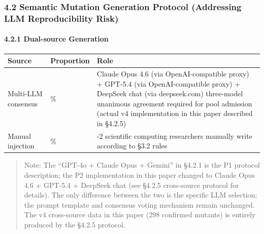 \documentclass[review,12pt,authoryear]{elsarticle}
\begin{document}
\subsubsection{4.2 Semantic Mutation Generation Protocol (Addressing LLM
Reproducibility
Risk)}\label{semantic-mutation-generation-protocol-addressing-llm-reproducibility-risk}

\paragraph{4.2.1 Dual-source Generation}\label{dual-source-generation}

{\def\LTcaptype{none} %
\begin{longtable}[]{@{}
  >{\raggedright\arraybackslash}p{}
  >{\raggedright\arraybackslash}p{}
  >{\raggedright\arraybackslash}p{}@{}}
\toprule\noalign{}
\begin{minipage}[b]{\linewidth}\raggedright
Source
\end{minipage} & \begin{minipage}[b]{\linewidth}\raggedright
Proportion
\end{minipage} & \begin{minipage}[b]{\linewidth}\raggedright
Role
\end{minipage} \\
\midrule\noalign{}
\endhead
\bottomrule\noalign{}
\endlastfoot
Multi-LLM consensus & 60\% & Claude Opus 4.6 (via OpenAI-compatible proxy) + GPT-5.4
(via OpenAI-compatible proxy) + DeepSeek chat (via deepseek.com) three-model unanimous
agreement required for pool admission (actual v4 implementation in this
paper described in §4.2.5) \\
Manual injection & 40\% & 1-2 scientific computing researchers manually
write according to §3.2 rules \\
\end{longtable}
}

\begin{quote}
Note: The ``GPT-4o + Claude Opus + Gemini'' in §4.2.1 is the P1 protocol
description; the P2 implementation in this paper changed to Claude Opus
4.6 + GPT-5.4 + DeepSeek chat (see §4.2.5 cross-source protocol for
details). The only difference between the two is the specific LLM
selection; the prompt template and consensus voting mechanism remain
unchanged. The v4 cross-source data in this paper (298 confirmed
mutants) is entirely produced by the §4.2.5 protocol.
\end{quote}
\end{document}
